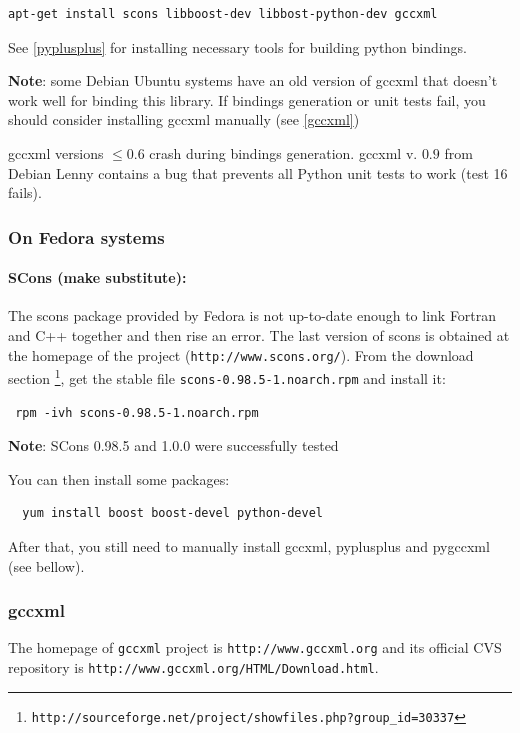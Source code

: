 \documentclass[12pt,a4paper]{article}
\begin{document}
\begin{verbatim}
apt-get install scons libboost-dev libbost-python-dev gccxml
\end{verbatim}
%
See \ref{pyplusplus} for installing necessary tools for building python bindings.


\textbf{Note}: some Debian Ubuntu systems have an old version of gccxml that doesn't work well for binding this
library. If bindings generation or unit tests fail, you should consider installing gccxml manually (see \ref{gccxml})

gccxml versions $\le 0.6$ crash during bindings generation. gccxml v. $0.9$ from Debian Lenny contains a bug that prevents all Python unit tests to work (test 16 fails).


\subsubsection{On Fedora systems}

\paragraph{SCons (make substitute):}
The scons package provided by Fedora is not up-to-date enough to link Fortran and C++ together and then rise an
error. The last version of scons is obtained at the homepage of the project ({\tt  http://www.scons.org/}).
From the download section \footnote{\tt http://sourceforge.net/project/showfiles.php?group\_id=30337}, 
get the stable file {\tt scons-0.98.5-1.noarch.rpm} and install it:

\begin{verbatim}
 rpm -ivh scons-0.98.5-1.noarch.rpm
\end{verbatim}

\textbf{Note}: SCons 0.98.5 and 1.0.0 were successfully tested


You can then install some packages:

\begin{verbatim}
  yum install boost boost-devel python-devel
\end{verbatim}


After that, you still need to manually install gccxml, pyplusplus and pygccxml (see bellow).


\subsubsection{gccxml\label{gccxml}}

The homepage of {\tt gccxml} project is {\tt http://www.gccxml.org} and its official 
CVS repository is {\tt http://www.gccxml.org/HTML/Download.html}.
\end{document}
